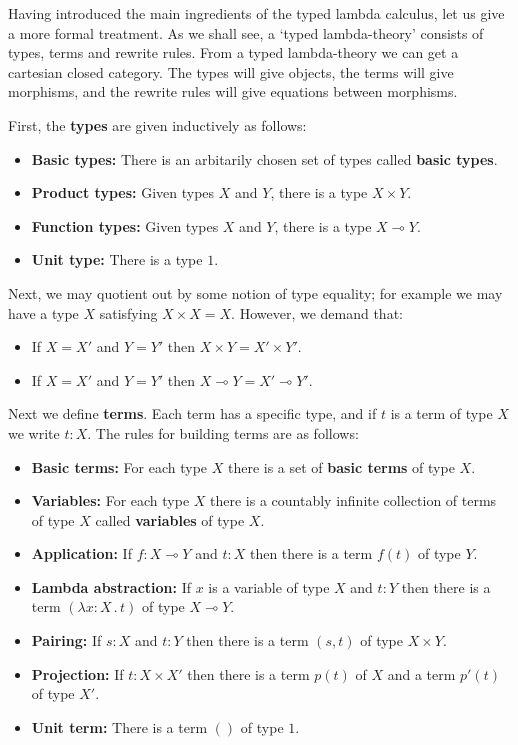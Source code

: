 \documentclass[12pt,twoside,openright]{report}
\newcommand{\lhom}{\multimap}
\begin{document}
Having introduced the main ingredients of the typed lambda calculus, let us give a more formal treatment.  As we shall see, a `typed lambda-theory' consists of types, terms and rewrite rules.  From a typed lambda-theory we can get a cartesian closed category.  The types will give objects, the terms will give morphisms, and the rewrite rules will give equations between morphisms.

First, the {\bf types} are given inductively as follows:
\begin{itemize}
\item {\bf Basic types:}
There is an arbitarily chosen set of types called {\bf basic types}.
\item {\bf Product types:}
Given types $X$ and $Y$, there is a type $X \times Y$.
\item {\bf Function types:}
Given types $X$ and $Y$, there is a type $X \lhom Y$.
\item {\bf Unit type:} There is a type $1$.
\end{itemize}
Next, we may quotient out by some notion of type equality; for example we may have a type $X$ satisfying $X \times X = X$.  However, we demand that:
\begin{itemize}
\item If $X = X'$ and $Y = Y'$ then $X \times Y = X' \times Y'$.
\item If $X = X'$ and $Y = Y'$ then $X \lhom Y = X' \lhom Y'$.
\end{itemize}

Next we define {\bf terms}.  Each term has a specific type, and if $t$
is a term of type $X$ we write $t\!:\!X$.  The rules for building terms are as follows:
\begin{itemize}
  \item {\bf Basic terms:} For each type $X$ there is a set of
{\bf basic terms} of type $X$.
  \item {\bf Variables:} For each type $X$ there is a countably infinite collection of terms of type $X$ called {\bf variables}
of type $X$.
  \item {\bf Application:} 
If $f:X \lhom Y$ and $t:X$ then there is a term $f(t)$ of type
$Y$.
  \item {\bf Lambda abstraction:} 
If $x$ is a variable of type $X$ and $t:Y$ 
then there is a term $(\lambda x\! : \!X \, .\, t)$ of type $X \lhom Y$.
  \item {\bf Pairing:} If $s:X$ and $t:Y$ then there is a term $(s,t)$ of type $X \times Y$.
  \item {\bf Projection:}
If $t:X \times X'$ then there is a term $p(t)$ of $X$ and a term
$p'(t)$ of type $X'$.
  \item {\bf Unit term:} There is a term $()$ of type $1$.
\end{itemize}
\end{document}
